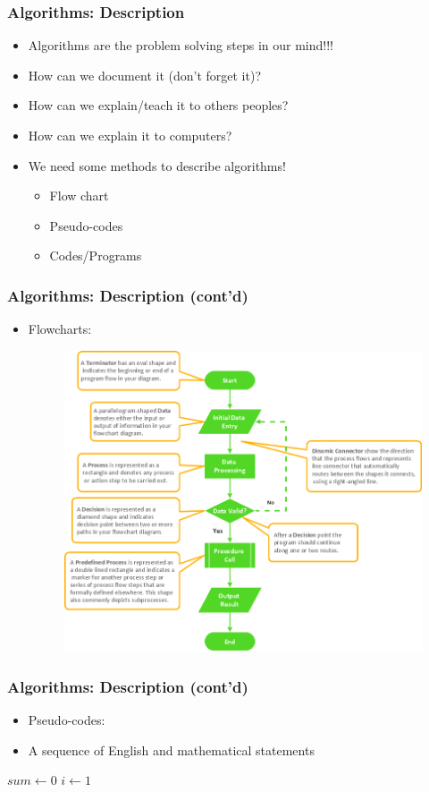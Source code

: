 \documentclass{../c-lecture}
\begin{document}
\begin{frame}
  \frametitle{Algorithms: Description}
  \begin{itemize}
    \item Algorithms are the problem solving steps in our mind!!!
    \item How can we document it (don’t forget it)?
    \item How can we explain/teach it to others peoples?
    \item How can we explain it to computers?
    \item We need some methods to describe algorithms!
    \begin{itemize}
      \item Flow chart
      \item Pseudo-codes
      \item Codes/Programs
    \end{itemize}
  \end{itemize}
\end{frame}

\begin{frame}
  \frametitle{Algorithms: Description (cont’d)}
  \begin{itemize}
    \item Flowcharts:
    \begin{figure}
      \includegraphics[width=.5\textwidth]{./img/flowchart.png}
    \end{figure}
  \end{itemize}
\end{frame}

\begin{frame}
  \frametitle{Algorithms: Description (cont’d)}
  \begin{itemize}
    \item Pseudo-codes:
    \item A sequence of English and mathematical statements
  \end{itemize}
  \begin{algorithm}[H]
  $sum \gets 0$\;
  $i \gets 1$\;
  \end{algorithm}
\end{frame}
\end{document}
